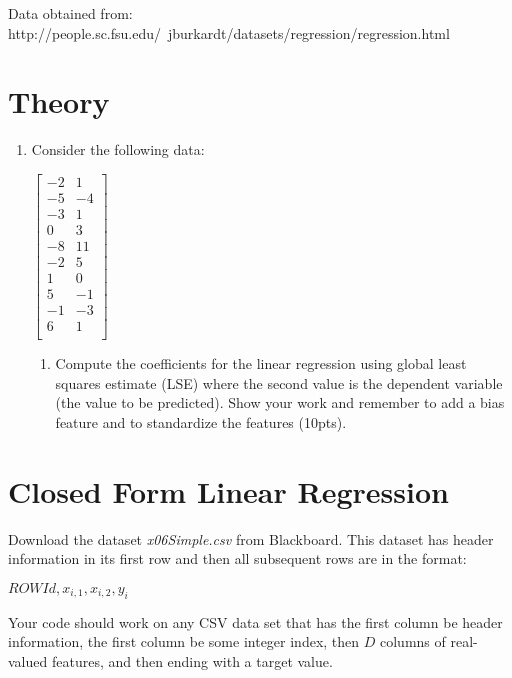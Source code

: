 \documentclass[12pt]{article}
\begin{document}
\noindent
Data obtained from:  http://people.sc.fsu.edu/~jburkardt/datasets/regression/regression.html

\newpage
\section{Theory}
\begin{enumerate}
\item Consider the following data:\\
\begin{center}
$
 \begin{bmatrix}
	-2 & 1\\
	-5 & -4\\	
	-3 & 1\\
	0 & 3\\
	-8 & 11\\
	-2 & 5\\
	1 & 0\\
	5 & -1\\
	-1 & -3\\
	6 & 1\\
\end{bmatrix}
$
\end{center}
	\begin{enumerate}
	\item Compute the coefficients for the linear regression using global least squares estimate (LSE) where the second value is the dependent variable (the value to be predicted).  Show your work and remember to add a bias feature and to standardize the features (10pts).\\
	\end{enumerate}
\end{enumerate}


\newpage
\section{Closed Form Linear Regression}\label{linreg}
Download the dataset \emph{x06Simple.csv} from Blackboard.  This dataset has header information in its first row and then all subsequent rows are in the format:
\begin{center}
$ROWId, x_{i,1}, x_{i,2}, y_i$
\end{center}
Your code should work on any CSV data set that has the first column be header information, the first column be some integer index, then $D$ columns of real-valued features, and then ending with a target value.\\
\end{document}
